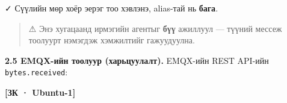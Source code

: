\begin{Shaded}
\begin{Highlighting}[]
 \KeywordTok{\{} \KeywordTok{;} \KeywordTok{\}}
\KeywordTok{;} \VariableTok{)}\NormalTok{; } 
 \OperatorTok{\textgreater{}}
\KeywordTok{;} \VariableTok{)}\NormalTok{; } 
 \OperatorTok{\textgreater{}}
\KeywordTok{;} \VariableTok{)}\NormalTok{; } 
 \VariableTok{$((}\VariableTok{))}\VariableTok{$((}\VariableTok{))} \KeywordTok{|} 
\end{Highlighting}
\end{Shaded}

✓ Сүүлийн мөр хоёр эерэг тоо хэвлэнэ, alias-тай нь \textbf{бага}.

\begin{quote}
⚠ Энэ хугацаанд ирмэгийн агентыг \textbf{бүү} ажиллуул --- түүний мессеж тоолуурт нэмэгдэж хэмжилтийг гажуудуулна.
\end{quote}

\textbf{2.5 EMQX-ийн тоолуур (харьцуулалт).} EMQX-ийн REST API-ийн \texttt{bytes.received}:

\textbf{{[}ЗК · Ubuntu-1{]}}

